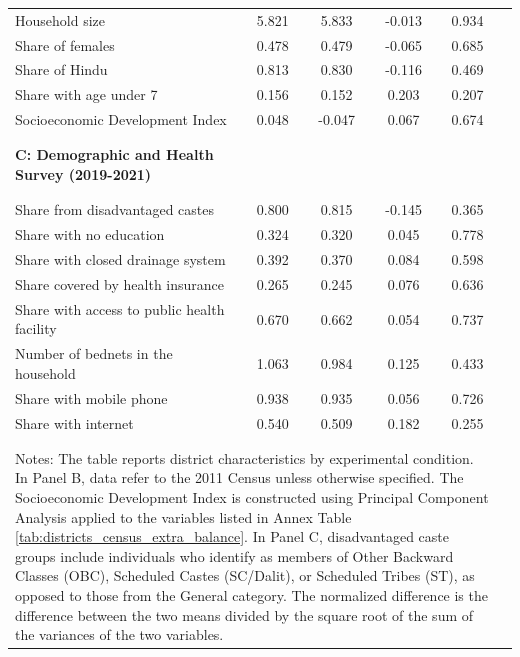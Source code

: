 {\begin{tabular}{lccccc}
Household size & 5.821 & 5.833 & -0.013 & 0.934 & \\
Share of females & 0.478 & 0.479 & -0.065 & 0.685 & \\
Share of Hindu & 0.813 & 0.830 & -0.116 & 0.469 & \\
Share with age under 7 & 0.156 & 0.152 & 0.203 & 0.207 & \\
Socioeconomic Development Index & 0.048 & -0.047 & 0.067 & 0.674 & \\
\hline \\[-5.1ex] &  &  &  &  & \\
 \textbf{C: Demographic and Health Survey (2019-2021)} &  &  &  &  & \\
 &  &  &  &  & \\[-5ex]\\
Share from disadvantaged castes &  0.800 &  0.815 &  -0.145  & 0.365  & \\
Share with no education & 0.324 & 0.320 & 0.045 & 0.778 & \\
Share with closed drainage system & 0.392 & 0.370 & 0.084 & 0.598 & \\
Share covered by health insurance & 0.265 & 0.245 & 0.076 & 0.636 & \\
Share with access to public health facility & 0.670 & 0.662 & 0.054 & 0.737 & \\
Number of bednets in the household & 1.063 & 0.984 & 0.125 & 0.433 & \\
Share with mobile phone & 0.938 & 0.935 & 0.056 & 0.726 & \\
Share with internet & 0.540 & 0.509 & 0.182 & 0.255 & \\
\hline \hline \\[-5.1ex] &  &  &  &  & \\
\multicolumn{5}{p{.95\linewidth}}{\scriptsize Notes: The table reports district characteristics by experimental condition.  In Panel B, data refer to the 2011 Census unless otherwise specified. The Socioeconomic Development Index is constructed using Principal Component Analysis applied to the variables listed in Annex Table \ref{tab:districts_census_extra_balance}. In Panel C, disadvantaged caste groups include individuals who identify as members of Other Backward Classes (OBC), Scheduled Castes (SC/Dalit), or Scheduled Tribes (ST), as opposed to those from the General category.  The normalized difference is the difference between the two means divided by the square root of the sum of the variances of the two variables. }
\end{tabular}
}%
\\
